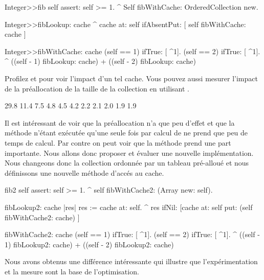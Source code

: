 \documentclass[a4paper,10pt,twoside]{book}
\begin{document}
\begin{code}{}
Integer>>fib
	self assert: self >= 1.
	^ Self fibWithCache: OrderedCollection new.

Integer>>fibLookup: cache
	^ cache at: self ifAbsentPut: [ self fibWithCache: cache ] 

Integer>>fibWithCache: cache
	(self == 1) ifTrue: [ ^1].
	(self == 2) ifTrue: [ ^1].
	^ ((self - 1) fibLookup: cache) + ((self - 2) fibLookup: cache)
\end{code}

Profilez  et  pour voir l'impact d'un tel
cache. Vous pouvez aussi mesurer l'impact de la pr\'eallocation de la
taille de la collection en utilisant .

\begin{code}{}
29.8%
11.4%
7.5%
4.8%
4.5%
4.2%
2.2%
2.1%
2.0%
1.9%
1.9%
\end{code}

Il est int\'eressant de voir que la pr\'eallocation n'a que peu
d'effet et que la m\'ethode  n'\'etant ex\'ecut\'ee
qu'une seule fois par calcul de  ne prend que peu de temps de
calcul. Par contre on peut voir que la m\'ethode  
prend une part importante. Nous allons donc proposer et \'evaluer une
 nouvelle impl\'ementation. Nous changeons donc la collection
 ordonn\'ee par un tableau pr\'e-allou\'e et nous d\'efinissons une
 nouvelle m\'ethode d'acc\'es au cache. 



\begin{code}{}
fib2
	self assert: self >= 1.
	^ self fibWithCache2: (Array new: self).

fibLookup2: cache
	|res|
	res := cache at: self.
	^ res ifNil: [cache at: self put: (self fibWithCache2: cache) ]
		
fibWithCache2: cache
 	(self == 1) ifTrue: [ ^1].
 	(self == 2) ifTrue: [ ^1].
 	^ ((self - 1) fibLookup2: cache) + ((self - 2) fibLookup2: cache)
\end{code}

Nous avons obtenus une diff\'erence int\'eressante qui illustre 
que
l'exp\'erimentation et la mesure sont la base de l'optimisation. 
\end{document}
